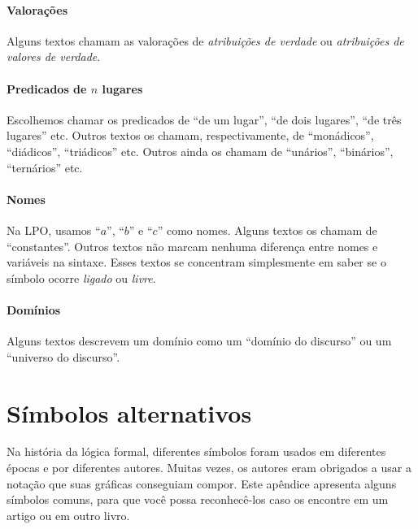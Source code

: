 \paragraph{Valorações} Alguns textos chamam as valorações de \emph{atribuições de verdade} ou \emph{atribuições de valores de verdade}.

\paragraph{Predicados de $n$ lugares} Escolhemos chamar os predicados de \textquotedblleft de um lugar\textquotedblright{}, \textquotedblleft de dois lugares\textquotedblright{}, \textquotedblleft de três lugares\textquotedblright{} etc. Outros textos os chamam, respectivamente, de \textquotedblleft monádicos\textquotedblright{}, \textquotedblleft diádicos\textquotedblright{}, \textquotedblleft triádicos\textquotedblright{} etc. Outros ainda os chamam de \textquotedblleft unários\textquotedblright{}, \textquotedblleft binários\textquotedblright{}, \textquotedblleft ternários\textquotedblright{} etc.

\paragraph{Nomes} Na LPO, usamos \textquotedblleft $a$\textquotedblright{}, \textquotedblleft $b$\textquotedblright{} e \textquotedblleft $c$\textquotedblright{} como nomes. Alguns textos os chamam de \textquotedblleft constantes\textquotedblright{}. Outros textos não marcam nenhuma diferença entre nomes e variáveis na sintaxe. Esses textos se concentram simplesmente em saber se o símbolo ocorre \emph{ligado} ou \emph{livre}.

\paragraph{Domínios} Alguns textos descrevem um domínio como um \textquotedblleft domínio do discurso\textquotedblright{} ou um \textquotedblleft universo do discurso\textquotedblright{}.

\section{Símbolos alternativos}
Na história da lógica formal, diferentes símbolos foram usados em diferentes épocas e por diferentes autores. Muitas vezes, os autores eram obrigados a usar a notação que suas gráficas conseguiam compor. Este apêndice apresenta alguns símbolos comuns, para que você possa reconhecê-los caso os encontre em um artigo ou em outro livro.

